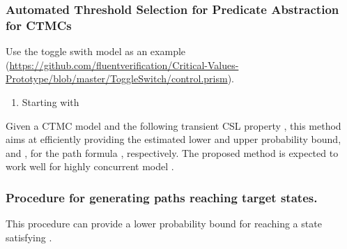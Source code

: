 \subsubsection*{Automated Threshold Selection for Predicate
	Abstraction for CTMCs}
Use the toggle swith model as an example
(\url{https://github.com/fluentverification/Critical-Values-Prototype/blob/master/ToggleSwitch/control.prism}). 
\begin{enumerate}
	\item Starting with 
	
\end{enumerate}  


Given a CTMC model \model{} and the following transient CSL property
\cslEventually, this method aims at efficiently providing the estimated lower
and upper probability bound, \probMin{} and \probMax, for the path
formula \eventuallyFull, respectively. The proposed method is expected
to work well for highly concurrent model \model{}. 

\subsubsection*{Procedure for generating paths reaching target
	states.}
This procedure can provide a lower probability bound for reaching a
state satisfying \targetSt.

